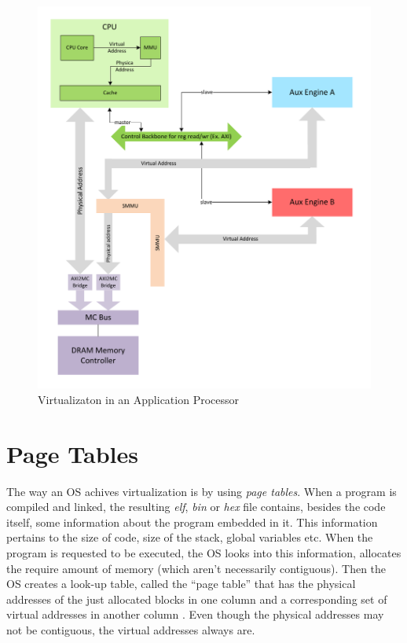 	\begin{figure}[h]
		\centering
		\includegraphics[width = \textwidth]{partSys/Virtualization}
		\caption{Virtualizaton in an Application Processor}
		\label{fig:virtualization}
	\end{figure}

\section{Page Tables}
The way an OS achives virtualization is by using \emph{page tables}. When a program is compiled and linked, the resulting \emph{elf}, \emph{bin} or \emph{hex} file contains, besides the code itself, some information about the program embedded in it. This information pertains to the size of code, size of the stack, global variables etc. When the program is requested to be executed, the OS looks into this information, allocates the require amount of memory (which aren't necessarily contiguous). Then the OS creates a look-up table, called the ``page table'' that has the physical addresses of the just allocated blocks in one column and a corresponding set of virtual addresses in another column . Even though the physical addresses may not be contiguous, the virtual addresses always are. 

